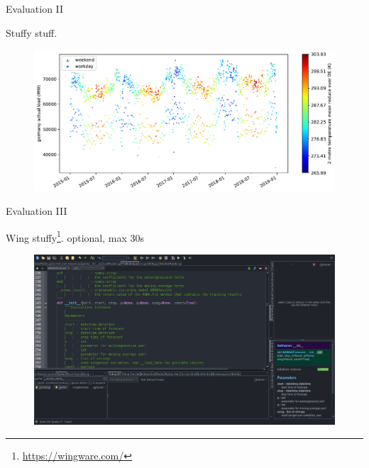 \documentclass[t,xcolor={table},fleqn]{beamer}
\begin{document}
\begin{frame}{Evaluation II}

Stuffy stuff.

\begin{figure}[h!]%
\centering
\includegraphics[width=\textwidth,origin=c]{../doc/plots/t2m_mean_2015010112_2018123112_24F}%
\end{figure}

\end{frame}


\begin{frame}{Evaluation III}

Wing stuffy\footnote{\url{https://wingware.com/}}. optional, max 30s%

\begin{figure}[h!]%
\centering
\includegraphics[width=.8\textwidth]{../doc/logos/Predictions_Wing_001}%
\end{figure}

\end{frame}
\end{document}
